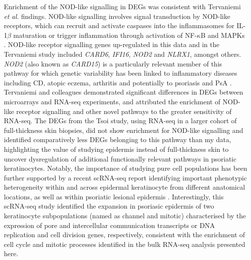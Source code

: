 Enrichment of the NOD-like signalling in DEGs was consistent with Tervaniemi \textit{et al.} findings. NOD-like signalling involves signal transduction by NOD-like receptors, which can recruit and activate caspases into the inflammasomes for IL-1$\beta$ maturation or trigger inflammation through activation of NF-$\kappa$B and MAPKs \parencite{McCormack2009}. NOD-like receptor signalling genes up-regulated in this data and in the Tervaniemi study included \textit{CARD6}, \textit{IFI16}, \textit{NOD2} and \textit{NLRX1}, amongst others. \textit{NOD2} (also known as \textit{CARD15}) is a particularly relevant member of this pathway for which genetic variability has been linked to inflammatory diseases including CD, atopic eczema, arthritis and potentially to psoriasis and PsA \parencite{Zhong2013,Zhu2012}. %
Tervaniemi and colleagues demonstrated significant differences in DEGs between microarrays and RNA-seq experiments, and attributed the enrichment of NOD-like receptor signalling and other novel pathways to the greater sensitivity of RNA-seq. The DEGs from the Tsoi study, using RNA-seq in a larger cohort of full-thickness skin biopsies, did not show enrichment for NOD-like signalling and identified comparatively less DEGs belonging to this pathway than my data, highlighting the value of studying epidermis instead of full-thickness skin to uncover dysregulation of additional functionally relevant pathways in psoriatic keratinocytes. Notably, the importance of studying pure cell populations has been further supported by a recent scRNA-seq report identifying important phenotypic heterogeneity within and across epidermal keratinocyte from different anatomical locations, as well as within psoriatic lesional epidermis \parencite{Cheng2018}. Interestingly, this scRNA-seq study identified the expansion in psoriasic epidermis of two keratinocyte subpopulations (named as channel and mitotic) characterised by the expression of pore and intercellular communication transcripts or DNA replication and cell division genes, respectively, consistent with the enrichment of cell cycle and mitotic processes identified in the bulk RNA-seq analysis presented here.

